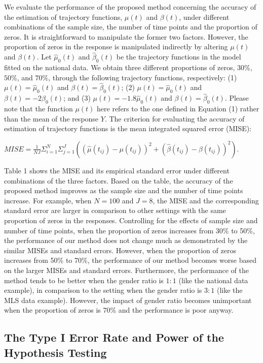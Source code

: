 We evaluate the performance of the proposed method concerning the
accuracy of the estimation of trajectory functions, $\mu(t)$ and
$\beta(t)$, under different combinations of the sample size, the
number of time points and the proportion of zeros. It is
straightforward to manipulate the former two factors. However, the
proportion of zeros in the response is manipulated indirectly by
altering $\mu(t)$ and $\beta(t)$. Let $\hat{\mu}_{0}(t)$ and
$\hat{\beta}_{0}(t)$ be the trajectory functions in the model
fitted on the national data. We obtain three different proportions
of zeros, $30\%$, $50\%$, and $70\%$, through the following
trajectory functions, respectively: (1) $\mu(t)=\hat{\mu}_{0}(t)$
and $\beta(t)=\hat{\beta}_{0}(t)$; (2) $\mu(t)=\hat{\mu}_{0}(t)$
and $\beta(t)=-2\hat{\beta}_{0}(t)$; and (3)
$\mu(t)=-1.8\hat{\mu}_{0}(t)$ and $\beta(t)=\hat{\beta}_{0}(t)$.
Please note that the function $\mu(t)$ here refers to the one
defined in Equation (1) rather than the mean of the response $Y$.
The criterion for evaluating the accuracy of estimation of
trajectory functions is the mean integrated squared error (MISE):
\begin{center}
$MISE=\frac{1}{NJ}\Sigma_{i=1}^{N}\Sigma_{j=1}^{J}((\hat{\mu}(t_{ij})-\mu(t_{ij}))^{2}+(\hat{\beta}(t_{ij})-\beta(t_{ij}))^{2}).$
\end{center}
Table 1 shows the MISE and its empirical standard error under
different combinations of the three factors. Based on the table,
the accuracy of the proposed method improves as the sample size
and the number of time points increase. For example, when $N=100$
and $J=8$, the MISE and the corresponding standard error are
larger in comparison to other settings with the same proportion of
zeros in the responses. Controlling for the effects of sample size
and number of time points, when the proportion of zeros increases
from 30\% to 50\%, the performance of our method does not change
much as demonstrated by the similar MISEs and standard errors.
However, when the proportion of zeros increases from 50\% to 70\%,
the performance of our method becomes worse based on the larger
MISEs and standard errors. Furthermore, the performance of the
method tends to be better when the gender ratio is $1:1$ (like the
national data example), in comparison to the setting when the
gender ratio is $3:1$ (like the MLS data example). However, the
impact of gender ratio becomes unimportant when the proportion of
zeros is 70\% and the performance is poor anyway.

\subsection{The Type I Error Rate and Power of the Hypothesis
Testing}

